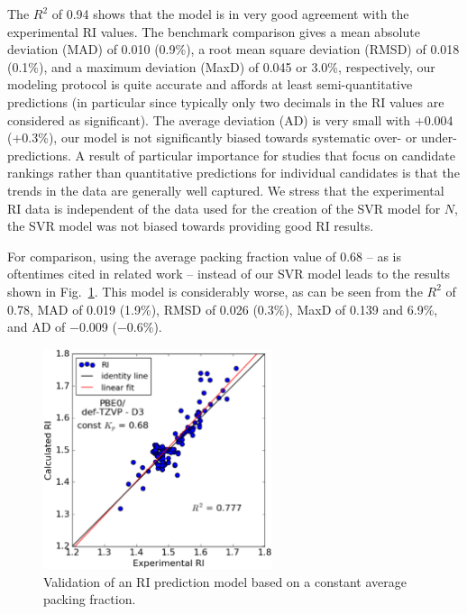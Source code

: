 The $R^2$ of 0.94 shows that the model is in very good agreement with the experimental RI values. The benchmark comparison gives a mean absolute deviation (MAD) of 0.010 (0.9\%), a root mean square deviation (RMSD) of 0.018 (0.1\%), and a maximum deviation (MaxD) of 0.045 or 3.0\%, respectively, \ie  our modeling protocol is quite accurate and affords at least semi-quantitative predictions (in particular since typically only two decimals in the RI values are considered as significant). The average deviation (AD) is very small with +0.004 (+0.3\%), \ie  our model is not significantly biased towards systematic over- or under-predictions. A result of particular importance for studies that focus on candidate rankings rather than quantitative predictions for individual candidates is that the trends in the data are generally well captured. We stress that the experimental RI data is independent of the data used for the creation of the SVR model for $N$, \ie  the SVR model was not biased towards providing good RI results.


For comparison, using the average packing fraction value of 0.68 -- as is oftentimes cited in related work -- instead of our SVR model leads to the results shown in Fig.\ \ref{fig:validation_const_Kp}. This model is considerably worse, as can be seen from the $R^2$ of 0.78, MAD of 0.019 (1.9\%), RMSD of 0.026 (0.3\%), MaxD of 0.139 and 6.9\%, and AD of $-$0.009 ($-$0.6\%).

\begin{figure}[htbp] 
	\centering
	\includegraphics[width=0.6\textwidth]{Chapter-2/Figures/PBE0_Kp_068.eps}
	\caption{Validation of an RI prediction model based on a constant average packing fraction.} 
	\label{fig:validation_const_Kp} 
\end{figure} 

